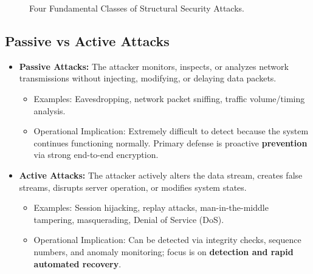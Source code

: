 \documentclass[11pt,a4paper,openany]{report}
\begin{document}
\begin{figure}[H]
\centering
{}
\caption{Four Fundamental Classes of Structural Security Attacks.}
\end{figure}

\subsection{Passive vs Active Attacks}
\begin{itemize}[leftmargin=*]
  \item \textbf{Passive Attacks:} The attacker monitors, inspects, or analyzes network transmissions without injecting, modifying, or delaying data packets.
    \begin{itemize}
      \item Examples: Eavesdropping, network packet sniffing, traffic volume/timing analysis.
      \item Operational Implication: Extremely difficult to detect because the system continues functioning normally. Primary defense is proactive \textbf{prevention} via strong end-to-end encryption.
    \end{itemize}
  \item \textbf{Active Attacks:} The attacker actively alters the data stream, creates false streams, disrupts server operation, or modifies system states.
    \begin{itemize}
      \item Examples: Session hijacking, replay attacks, man-in-the-middle tampering, masquerading, Denial of Service (DoS).
      \item Operational Implication: Can be detected via integrity checks, sequence numbers, and anomaly monitoring; focus is on \textbf{detection and rapid automated recovery}.
    \end{itemize}
\end{itemize}
\end{document}
